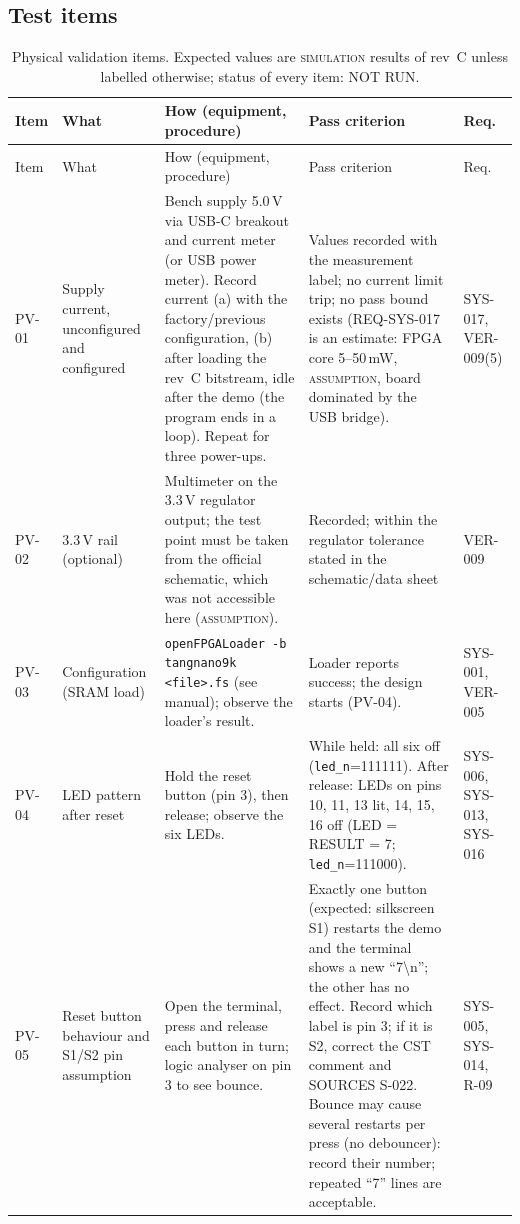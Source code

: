 \documentclass[10pt,a4paper]{article}
\newcommand{\lbl}[1]{\textsc{#1}}          %
\begin{document}
\subsection{Test items}
{\small
\begin{longtable}{@{}P{1.0cm}P{2.6cm}P{5.4cm}P{4.3cm}P{1.4cm}@{}}
\caption{Physical validation items. Expected values are \lbl{simulation}
results of rev~C unless labelled otherwise; status of every item: NOT RUN.}\label{tab:pvp}\\
\toprule
Item & What & How (equipment, procedure) & Pass criterion & Req.\\
\midrule
\endfirsthead
\toprule
Item & What & How (equipment, procedure) & Pass criterion & Req.\\
\midrule
\endhead
PV-01 & Supply current, unconfigured and configured & Bench supply 5.0\,V via USB-C breakout and current meter (or USB power meter). Record current (a) with the factory/previous configuration, (b) after loading the rev~C bitstream, idle after the demo (the program ends in a loop). Repeat for three power-ups. & Values recorded with the measurement label; no current limit trip; no pass bound exists (REQ-SYS-017 is an estimate: FPGA core 5--50\,mW, \lbl{assumption}, board dominated by the USB bridge). & SYS-017, VER-009(5) \\
PV-02 & 3.3\,V rail (optional) & Multimeter on the 3.3\,V regulator output; the test point must be taken from the official schematic, which was not accessible here (\lbl{assumption}). & Recorded; within the regulator tolerance stated in the schematic/data sheet & VER-009 \\
PV-03 & Configuration (SRAM load) & \texttt{openFPGALoader -b tangnano9k <file>.fs} (see manual); observe the loader's result. & Loader reports success; the design starts (PV-04). & SYS-001, VER-005 \\
PV-04 & LED pattern after reset & Hold the reset button (pin 3), then release; observe the six LEDs. & While held: all six off (\texttt{led\_n}=111111). After release: LEDs on pins 10, 11, 13 lit, 14, 15, 16 off (LED = RESULT = 7; \texttt{led\_n}=111000). & SYS-006, SYS-013, SYS-016 \\
PV-05 & Reset button behaviour and S1/S2 pin assumption & Open the terminal, press and release each button in turn; logic analyser on pin 3 to see bounce. & Exactly one button (expected: silkscreen S1) restarts the demo and the terminal shows a new ``7\textbackslash n''; the other has no effect. Record which label is pin 3; if it is S2, correct the CST comment and SOURCES S-022. Bounce may cause several restarts per press (no debouncer): record their number; repeated ``7'' lines are acceptable. & SYS-005, SYS-014, R-09 \\

\end{longtable}}
\end{document}
